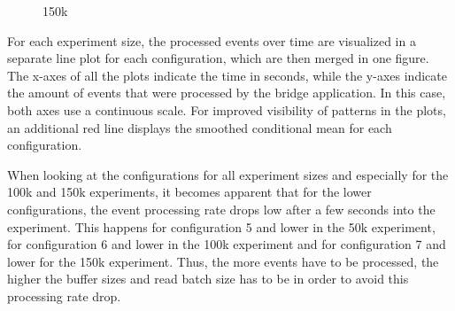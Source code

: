 \begin{figure}[h]
        \caption{150k}
        \label{fig:evaluation:performance:config-comparison_150k}
\end{figure}

For each experiment size, the processed events over time are visualized in a separate line plot for each configuration, which are then merged in one figure.
The x-axes of all the plots indicate the time in seconds, while the y-axes indicate the amount of events that were processed by the bridge application.
In this case, both axes use a continuous scale.
For improved visibility of patterns in the plots, an additional red line displays the smoothed conditional mean for each configuration.

When looking at the configurations for all experiment sizes and especially for the 100k and 150k experiments, it becomes apparent that for the lower configurations, the event processing rate drops low after a few seconds into the experiment.
This happens for configuration 5 and lower in the 50k experiment, for configuration 6 and lower in the 100k experiment and for configuration 7 and lower for the 150k experiment.
Thus, the more events have to be processed, the higher the buffer sizes and read batch size has to be in order to avoid this processing rate drop.

